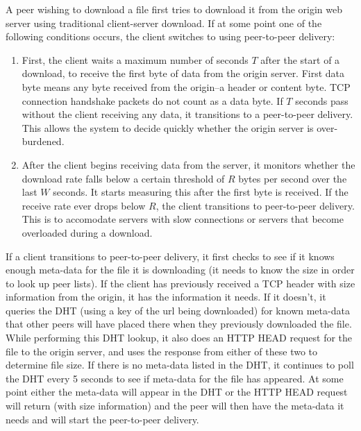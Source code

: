 A peer wishing to download a file first tries to download it from the origin web server using traditional client-server download.  
If at some point one of the following conditions occurs, the client switches to using 
peer-to-peer delivery:
\begin{enumerate}
\item First, the client waits a maximum number of seconds $T$ after the start of a download, to receive the first byte of data from the origin server.  
First data byte means any byte received from the origin--a header or content byte.  TCP connection handshake packets do not count as a data byte.
If $T$ seconds pass without the client receiving any data, it transitions to a peer-to-peer delivery.  This allows the system to decide quickly whether the origin server is over-burdened.   
\item After the client begins receiving data from the server, it monitors whether the download rate falls below a certain 
threshold of $R$ bytes per second over the last $W$ seconds.  It starts measuring this after the first byte is received.  
If the receive rate ever drops below $R$, the client transitions to peer-to-peer delivery.  
This is to accomodate servers with slow connections or servers that become overloaded during a download.
\end{enumerate}

If a client transitions to peer-to-peer delivery, it first checks to see if it knows enough meta-data for the file it is downloading (it needs to know the size in order to look up peer lists).
If the client has previously received a TCP header with size information from the origin, it has the information it needs.  If it doesn't, it
queries the DHT (using a key of the url being downloaded) for known meta-data that other peers will have placed there when they previously downloaded the file.  While performing
this DHT lookup, it also does an HTTP HEAD 
request for the file to the origin server, and uses the response from either of these two to determine file size.  
If there is no meta-data listed in the DHT, it continues to poll the DHT every 5 seconds to see if meta-data for the file has appeared.  At some point
either the meta-data will appear in the DHT or the HTTP HEAD request will return (with size information) and the peer will then have the meta-data it needs and will start the peer-to-peer
delivery.

